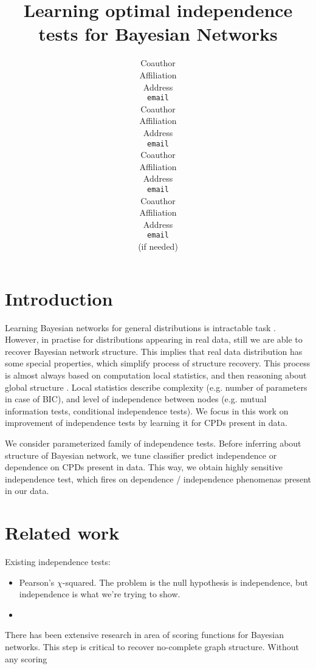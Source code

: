 \documentclass{article} %
\title{Learning optimal independence tests for Bayesian Networks}
\author{
\And
Coauthor \\
Affiliation \\
Address \\
\texttt{email} \\
\AND
Coauthor \\
Affiliation \\
Address \\
\texttt{email} \\
\And
Coauthor \\
Affiliation \\
Address \\
\texttt{email} \\
\And
Coauthor \\
Affiliation \\
Address \\
\texttt{email} \\
(if needed)\\
}
\begin{document}
\maketitle

\begin{abstract}

\end{abstract}


\section{Introduction}
Learning Bayesian networks for general distributions is
intractable task \cite{chickering1996learning}. However, in practise 
for distributions appearing in real data, still we are able to 
recover Bayesian network structure. This implies that real data
distribution has some special properties, which simplify process
of structure recovery. This process is almost always
based on computation local statistics, and then 
reasoning about global structure \cite{jaakkola2010learning, tsamardinos2006max}. 
Local statistics describe
complexity (e.g. number of parameters in case of BIC), and 
level of independence between nodes (e.g. mutual information tests, 
conditional independence tests). 
We focus in this work on improvement of independence tests by 
learning it for CPDs present in data.



We consider parameterized family of independence tests. 
Before inferring about structure of Bayesian network, we tune classifier 
predict independence or dependence on CPDs present in data. 
This way, we obtain highly sensitive independence test, which
fires on dependence / independence phenomenas present in our data. 


\section{Related work}
Existing independence tests:
\begin{itemize}
\item Pearson's $\chi$-squared.  The problem is the null hypothesis is independence, but independence is what we're trying to show.
\item
\end{itemize}

There has been extensive research in area of scoring functions for
Bayesian networks. This step is critical to recover no-complete graph structure.
Without any scoring 
\end{document}
